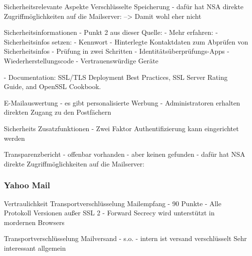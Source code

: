 \documentclass  [paper=a4,
				fontsize=12pt,
				listof=totoc,
				bibliography=totoc
				]{scrreprt}
\begin{document}
			Sicherheitsrelevante Aspekte			
			Verschlüsselte Speicherung
			- dafür hat NSA direkte Zugriffmöglichkeiten auf die Mailserver:
			--> Damit wohl eher nicht
			
			Sicherheitsinformationen
			- Punkt 2 aus dieser Quelle:
			- Mehr erfahren:
			- Sicherheitsinfos setzen:
				- Kennwort
				- Hinterlegte Kontaktdaten zum Abprüfen von Sicherheitsinfos
				- Prüfung in zwei Schritten 
				- Identitätsüberprüfungs-Apps
				- Wiederherstellungscode
				- Vertrauenswürdige Geräte 
			
			- Documentation: SSL/TLS Deployment Best Practices, SSL Server Rating Guide, and OpenSSL Cookbook.
			
			E-Mailauswertung
			- es gibt personalisierte Werbung
			- Administratoren erhalten direkten Zugang zu den Postfächern
			
			Sicherheits Zusatzfunktionen
			- Zwei Faktor Authentifizierung kann eingerichtet werden
			
			Transparenzbericht
			- offenbar vorhanden
			- aber keinen gefunden
			- dafür hat NSA direkte Zugriffmöglichkeiten auf die Mailserver:
			
			\subsubsection*{Yahoo Mail}
			\label{subsubsec:yahoo}
			
			Vertraulichkeit
			Transportverschlüsselung Mailempfang
			- 90 Punkte
			- Alle Protokoll Versionen außer SSL 2
			- Forward Secrecy wird unterstützt in mordernen Browsers
			
			Transportverschlüsselung Mailversand
			-  s.o.
			- intern ist versand verschlüsselt
			Sehr interessant allgemein
			
\end{document}
